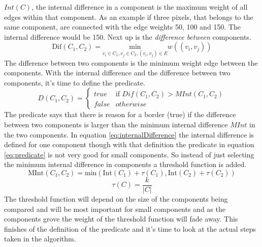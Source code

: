 \(Int(C)\), the internal difference in a component is the maximum weight of
all edges within that component. As an example if three pixels, that belongs to the same component,
are connected with the edge weights 50, 100 and 150. The internal difference
would be 150. Next up is the {\em difference between} components.
\begin{equation}
    \label{eq:differenceBetween}
    \text{Dif}(C_1,C_2) = \underset{v_i \in C_1,v_j \in C_2, (v_i,v_j) \in E}{\text{min}} w((v_i,v_j))
\end{equation}
The difference between two components is the minimum weight edge between the
components. With the internal difference and the difference between two components,
it's time to define the predicate.
\begin{equation}
    \label{eq:predicate}
    D(C_1,C_2) =
    \begin{cases}
        true & \text{if } Dif(C_1,C_2) > MInt(C_1,C_2) \\
        false & otherwise
    \end{cases}
\end{equation}
The predicate says that there is reason for a border (true) if the difference
between two components is larger than the minimum internal difference \(MInt\)
in the two components. In equation \ref{eq:internalDifference} the internal
difference is defined for one component though with that definition the predicate
in equation \ref{eq:predicate} is not very good for small components. So instead
of just selecting the minimum internal difference in components a threshold function
is added.
\begin{equation}
    \label{eq:minimumInternal}
    \text{MInt}(C_1,C_2) = \text{min}(\text{Int}(C_1) + \tau(C_1),\text{Int}(C_2) + \tau(C_2))
\end{equation}
\begin{equation}
    \label{eq:threshold}
    \tau(C) = \frac{k}{|C|}
\end{equation}
The threshold function will depend on the size of the components being compared
and will be most important for small components and as the components grove the
weight of the threshold function will fade away. This finishes of the definition
of the predicate and it's time to look at the actual steps taken in the
algorithm.

